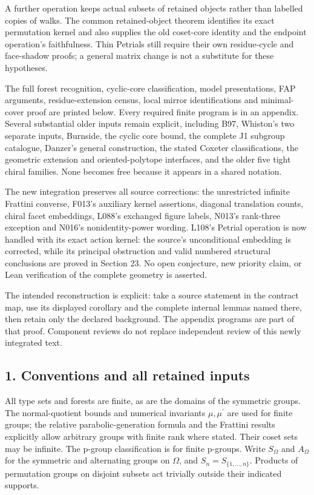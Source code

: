 \documentclass[
  10pt,
  letterpaper,
]{article}
\begin{document}
A further operation keeps actual subsets of retained objects rather than
labelled copies of walks. The common retained-object theorem identifies
its exact permutation kernel and also supplies the old coset-core
identity and the endpoint operation's faithfulness. Thin Petrials still
require their own residue-cycle and face-shadow proofs; a general matrix
change is not a substitute for these hypotheses.

The full forest recognition, cyclic-core classification, model
presentations, FAP arguments, residue-extension census, local mirror
identifications and minimal-cover proof are printed below. Every
required finite program is in an appendix. Several substantial older
inputs remain explicit, including B97, Whiston's two separate inputs,
Burnside, the cyclic core bound, the complete J1 subgroup catalogue,
Danzer's general construction, the stated Coxeter classifications, the
geometric extension and oriented-polytope interfaces, and the older five
tight chiral families. None becomes free because it appears in a shared
notation.

The new integration preserves all source corrections: the unrestricted
infinite Frattini converse, F013's auxiliary kernel assertions, diagonal
translation counts, chiral facet embeddings, L088's exchanged figure
labels, N013's rank-three exception and N016's nonidentity-power
wording. L108's Petrial operation is now handled with its exact action
kernel: the source's unconditional embedding is corrected, while its
principal obstruction and valid numbered structural conclusions are
proved in Section 23. No open conjecture, new priority claim, or Lean
verification of the complete geometry is asserted.

The intended reconstruction is explicit: take a source statement in the
contract map, use its displayed corollary and the complete internal
lemmas named there, then retain only the declared background. The
appendix programs are part of that proof. Component reviews do not
replace independent review of this newly integrated text.

\subsection{1. Conventions and all retained
inputs}\label{conventions-and-all-retained-inputs}

All type sets and forests are finite, as are the domains of the
symmetric groups. The normal-quotient bounds and numerical invariants
\(\mu,\mu^{\prime}\) are used for finite groups; the relative
parabolic-generation formula and the Frattini results explicitly allow
arbitrary groups with finite rank where stated. Their coset sets may be
infinite. The p-group classification is for finite p-groups. Write
\(S_\Omega\) and \(A_\Omega\) for the symmetric and alternating groups
on \(\Omega\), and \(S_n=S_{\{1,\ldots,n\}}\). Products of permutation
groups on disjoint subsets act trivially outside their indicated
supports.
\end{document}
